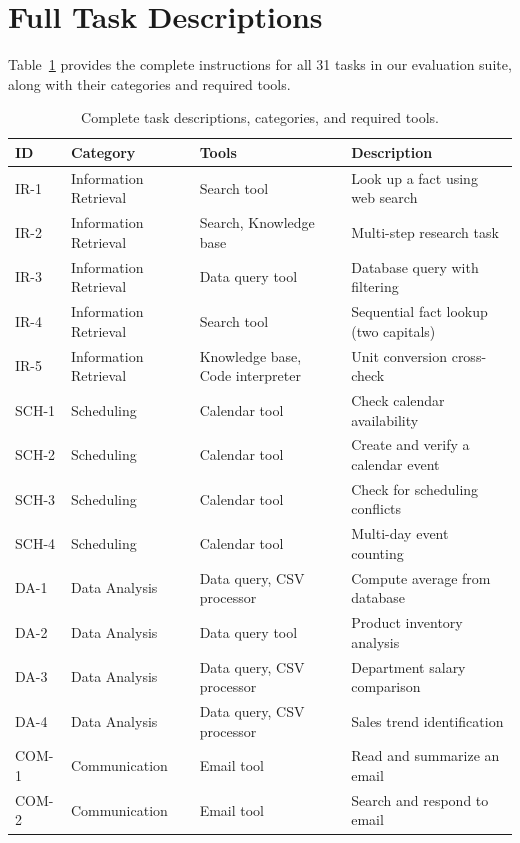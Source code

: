 
\section{Full Task Descriptions}
\label{app:tasks}

Table~\ref{tab:full_tasks} provides the complete instructions for all 31 tasks in our evaluation suite, along with their categories and required tools.

\begin{table}[h]
\centering
\caption{Complete task descriptions, categories, and required tools.}
\label{tab:full_tasks}
\small
\setlength{\tabcolsep}{4pt}
\begin{tabular}{lllp{5cm}}
\toprule
\textbf{ID} & \textbf{Category} & \textbf{Tools} & \textbf{Description} \\
\midrule
IR-1 & Information Retrieval & Search tool & Look up a fact using web search \\
IR-2 & Information Retrieval & Search, Knowledge base & Multi-step research task \\
IR-3 & Information Retrieval & Data query tool & Database query with filtering \\
IR-4 & Information Retrieval & Search tool & Sequential fact lookup (two capitals) \\
IR-5 & Information Retrieval & Knowledge base, Code interpreter & Unit conversion cross-check \\
SCH-1 & Scheduling & Calendar tool & Check calendar availability \\
SCH-2 & Scheduling & Calendar tool & Create and verify a calendar event \\
SCH-3 & Scheduling & Calendar tool & Check for scheduling conflicts \\
SCH-4 & Scheduling & Calendar tool & Multi-day event counting \\
DA-1 & Data Analysis & Data query, CSV processor & Compute average from database \\
DA-2 & Data Analysis & Data query tool & Product inventory analysis \\
DA-3 & Data Analysis & Data query, CSV processor & Department salary comparison \\
DA-4 & Data Analysis & Data query, CSV processor & Sales trend identification \\
COM-1 & Communication & Email tool & Read and summarize an email \\
COM-2 & Communication & Email tool & Search and respond to email \\

\end{tabular}
\end{table}
